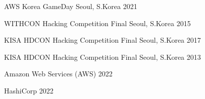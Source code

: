 \begin{cvhonours}

	{AWS Korea GameDay} %
	{Seoul, S.Korea} %
	{2021} %

	{WITHCON Hacking Competition Final} %
	{Seoul, S.Korea} %
	{2015} %

	{KISA HDCON Hacking Competition Final} %
	{Seoul, S.Korea} %
	{2017} %

	{KISA HDCON Hacking Competition Final} %
	{Seoul, S.Korea} %
	{2013} %

\end{cvhonours}



\begin{cvhonours}

	{Amazon Web Services (AWS)} %
	{} %
	{2022} %

	{HashiCorp} %
	{} %
	{2022} %

\end{cvhonours}
